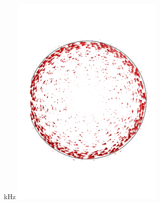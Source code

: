 \documentclass[compress]{beamer}
\begin{document}
\begin{frame}
\begin{columns}[totalwidth=\textwidth]
\begin{column}{.49\textwidth}
\end{column}
\begin{column}{.49\textwidth}
 kHz
       \includegraphics[height=0.59\textwidth ,width=0.59\textwidth]{Graphic/eddy_100khz.pdf}
\end{column}
\end{columns}
\end{frame}
\end{document}
